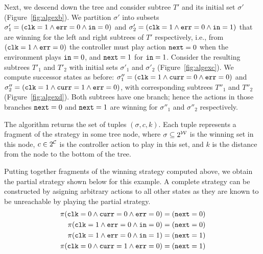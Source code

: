 Next, we descend down the tree and consider subtree $T'$ and its initial set $\sigma'$ (Figure~\ref{fig:algexb}).  We partition $\sigma'$ into subsets $\sigma_1' = (\texttt{clk} = 1 \land \texttt{err} = 0 \land \texttt{in} = 0)$ and $\sigma_2' = (\texttt{clk} = 1 \land \texttt{err} = 0 \land \texttt{in} = 1)$ that are winning for the left and right subtrees of $T'$ respectively, i.e., from $(\texttt{clk} = 1 \land \texttt{err} = 0)$ the controller must play action $\texttt{next} = 0$ when the environment plays $\texttt{in} = 0$, and $\texttt{next} = 1$ for $\texttt{in} = 1$.  Consider the resulting subtrees $T'_1$ and $T'_2$ with initial sets $\sigma'_1$ and $\sigma'_2$ (Figure~\ref{fig:algexc}).  We compute successor states as before: $\sigma''_1 = (\texttt{clk} = 1 \land \texttt{curr} = 0 \land \texttt{err} = 0)$ and $\sigma''_2 = (\texttt{clk} = 1 \land \texttt{curr} = 1 \land \texttt{err} = 0)$, with corresponding subtrees $T''_1$ and $T''_2$ (Figure~\ref{fig:algexd}).  Both subtrees have one branch; hence the actions in those branches $\texttt{next} = 0$ and $\texttt{next} = 1$ are winning for $\sigma''_1$ and $\sigma''_2$ respectively.

The algorithm returns the set of tuples $(\sigma, c, k)$.  Each tuple represents a fragment of the strategy in some tree node, where $\sigma \subseteq 2^{\mathcal{W}}$ is the winning set in this node, $c \in 2^{\mathcal{C}}$ is the controller action to play in this set, and $k$ is the distance from the node to the bottom of the tree.

Putting together fragments of the winning strategy computed above, we obtain the partial strategy shown below for this example. A complete strategy can be constructed by asigning arbitrary actions to all other states as they are known to be unreachable by playing the partial strategy.
\begin{align*}
    \pi(\texttt{clk} = 0 \land \texttt{curr} = 0 \land \texttt{err} = 0) &= (\texttt{next} = 0) \\
    \pi(\texttt{clk} = 1 \land \texttt{err} = 0 \land \texttt{in} = 0) &= (\texttt{next} = 0) \\
    \pi(\texttt{clk} = 1 \land \texttt{err} = 0 \land \texttt{in} = 1) &= (\texttt{next} = 1) \\
    \pi(\texttt{clk} = 0 \land \texttt{curr} = 1 \land \texttt{err} = 0) &= (\texttt{next} = 1)
\end{align*}





